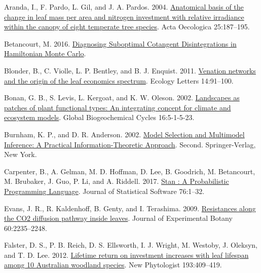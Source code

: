 \documentclass[
  12pt,
]{article}
\newlength{\cslhangindent}
\newlength{\cslentryspacingunit} %
\newenvironment{CSLReferences}[2] %
 {%
  \setlength{\parindent}{0pt}
  \ifodd #1
  \let\oldpar\par
  \def\par{\hangindent=\cslhangindent\oldpar}
  \fi
  \setlength{\parskip}{#2\cslentryspacingunit}
 }%
 {}
\begin{document}
\hypertarget{refs}{}
\begin{CSLReferences}{1}{0}
\leavevmode{}%
Aranda, I., F. Pardo, L. Gil, and J. A. Pardos. 2004. \href{https://doi.org/10.1016/j.actao.2004.01.003}{Anatomical basis of the change in leaf mass per area and nitrogen investment with relative irradiance within the canopy of eight temperate tree species}. Acta Oecologica 25:187--195.

\leavevmode{}%
Betancourt, M. 2016. \href{https://arxiv.org/abs/1604.00695}{Diagnosing {Suboptimal Cotangent Disintegrations} in {Hamiltonian Monte Carlo}}.

\leavevmode{}%
Blonder, B., C. Violle, L. P. Bentley, and B. J. Enquist. 2011. \href{https://doi.org/10.1111/j.1461-0248.2010.01554.x}{Venation networks and the origin of the leaf economics spectrum}. Ecology Letters 14:91--100.

\leavevmode{}%
Bonan, G. B., S. Levis, L. Kergoat, and K. W. Oleson. 2002. \href{https://doi.org/10.1029/2000GB001360}{Landscapes as patches of plant functional types: An integrating concept for climate and ecosystem models}. Global Biogeochemical Cycles 16:5-1-5-23.

\leavevmode{}%
Burnham, K. P., and D. R. Anderson. 2002. \href{https://doi.org/10.1007/b97636}{Model {Selection} and {Multimodel Inference}: A {Practical Information}-{Theoretic Approach}}. Second. {Springer-Verlag}, {New York}.

\leavevmode{}%
Carpenter, B., A. Gelman, M. D. Hoffman, D. Lee, B. Goodrich, M. Betancourt, M. Brubaker, J. Guo, P. Li, and A. Riddell. 2017. \href{https://doi.org/10.18637/jss.v076.i01}{Stan : A {Probabilistic Programming Language}}. Journal of Statistical Software 76:1--32.

\leavevmode{}%
Evans, J. R., R. Kaldenhoff, B. Genty, and I. Terashima. 2009. \href{https://doi.org/10.1093/jxb/erp117}{Resistances along the {CO2} diffusion pathway inside leaves}. Journal of Experimental Botany 60:2235--2248.

\leavevmode{}%
Falster, D. S., P. B. Reich, D. S. Ellsworth, I. J. Wright, M. Westoby, J. Oleksyn, and T. D. Lee. 2012. \href{https://doi.org/10.1111/j.1469-8137.2011.03940.x}{Lifetime return on investment increases with leaf lifespan among 10 {Australian} woodland species}. New Phytologist 193:409--419.


\end{CSLReferences}
\end{document}
